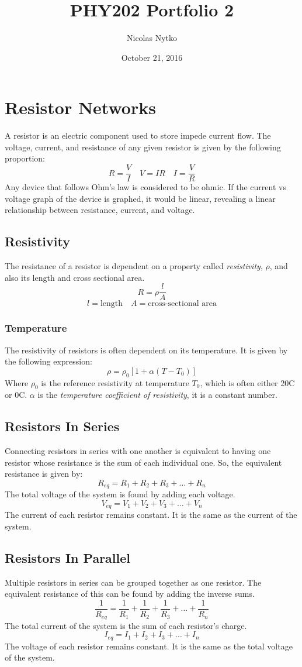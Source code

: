 \documentclass{article}
\title{PHY202 Portfolio 2}
\author{Nicolas Nytko}
\date{October 21, 2016}
\begin{document}
\maketitle
\newpage
\section{Resistor Networks}
A resistor is an electric component used to store impede current flow.  The voltage, current, and resistance of any given resistor is given by the following proportion:
\[R=\frac{V}{I} \quad V=IR \quad I=\frac{V}{R} \]
Any device that follows Ohm's law is considered to be ohmic.  If the current vs voltage graph of the device is graphed, it would be linear, revealing a linear relationship between resistance, current, and voltage.
\subsection{Resistivity}
The resistance of a resistor is dependent on a property called \textit{resistivity}, $\rho$, and also its length and cross sectional area.
\[ R = \rho \frac{l}{A} \]
\[ l = \text{length} \quad A = \text{cross-sectional area} \]
\subsubsection{Temperature}
The resistivity of resistors is often dependent on its temperature.  It is given by the following expression:
\[ \rho = \rho_0 \left[ 1 + \alpha (T - T_0) \right] \]
Where $\rho_0$ is the reference resistivity at temperature $T_0$, which is often either 20{\textdegree}C or 0{\textdegree}C.  $\alpha$ is the \textit{temperature coefficient of resistivity}, it is a constant number.
\subsection{Resistors In Series}
Connecting resistors in series with one another is equivalent to having one resistor whose resistance is the sum of each individual one.  So, the equivalent resistance is given by:
\[R_{eq} = R_1 + R_2 + R_3 + \ldots + R_n\]
The total voltage of the system is found by adding each voltage.
\[V_{eq} = V_1 + V_2 + V_3 + \ldots + V_n\]
The current of each resistor remains constant.  It is the same as the current of the system.
\subsection{Resistors In Parallel}
Multiple resistors in series can be grouped together as one resistor.  The equivalent resistance of this can be found by adding the inverse sums.
\[\frac{1}{R_{eq}} = \frac{1}{R_1} + \frac{1}{R_2} + \frac{1}{R_3} + \ldots + \frac{1}{R_n}\]
The total current of the system is the sum of each resistor's charge.
\[I_{eq} = I_1 + I_2 + I_3 + \ldots + I_n\]
The voltage of each resistor remains constant.  It is the same as the total voltage of the system.
\end{document}
